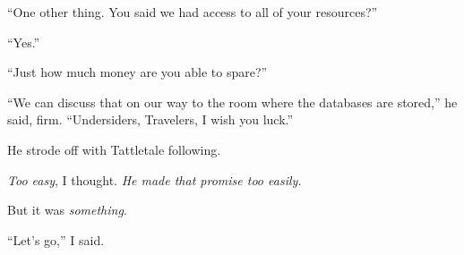 ``One other thing.  You said we had access to all of your resources?''



``Yes.''



``Just how much money are you able to spare?''



``We can discuss that on our way to the room where the databases are stored,'' he said, firm.  ``Undersiders, Travelers, I wish you luck.''



He strode off with Tattletale following.



\emph{Too easy}, I thought.  \emph{He made that promise too easily.}



But it was \emph{something}.



``Let's go,'' I said.





